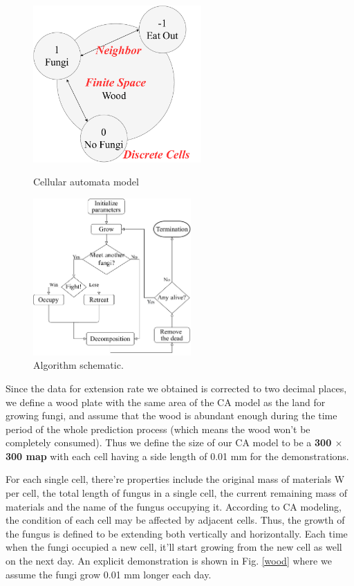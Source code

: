\documentclass[a4paper,12pt]{article}
\begin{document}
\begin{figure}[] 
	\centering 
	\begin{minipage}{40ex}
	\includegraphics[height=6cm]{./picture/CA.pdf}
	\caption{Cellular automata model}
	\label{f1ForCA}
	\end{minipage}
	\begin{minipage}{40ex}
	\includegraphics[height=6cm]{./picture/liucheng.pdf}
	\caption{Algorithm schematic.}
	\label{AS}
	\end{minipage}
\end{figure}

Since the data for extension rate we obtained is corrected to two decimal places, we define a wood plate with the same area of the CA model as the land for growing fungi, and assume that the wood is abundant enough during the time period of the whole prediction process (which means the wood won't be completely consumed). Thus we define the size of our CA model to be a \textbf{300 $\times$ 300 map} with each cell having a side length of 0.01 mm for the demonstrations. 

For each single cell, there're properties include the original mass of materials W per cell, the total length of fungus in a single cell, the current remaining mass of materials and the name of the fungus occupying it.  According to CA modeling, the condition of each cell may be affected by adjacent cells. Thus, the growth of the fungus is defined to be extending both vertically and horizontally. Each time when the fungi occupied a new cell, it'll start growing from the new cell as well on the next day. An explicit demonstration is shown in Fig. \ref{wood} where we assume the fungi grow 0.01 mm longer each day.
\end{document}
